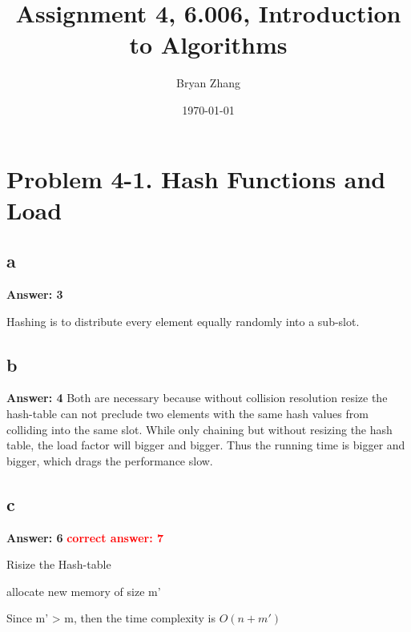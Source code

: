 \documentclass[12pt]{article}%
\newcommand{\runningTime}[1]{$O(#1)$}
\newcommand{\correctAnswer}[1]{\textbf{\textcolor{red}{correct answer: #1  \\}}}
\begin{document}
\title{Assignment 4, 6.006, Introduction to Algorithms}
\author{Bryan Zhang}
\date{\today}
\maketitle



\section{Problem 4-1. Hash Functions and Load}

\subsection{a}
\textbf{Answer: 3} \par
Hashing is to distribute every element equally randomly into a sub-slot.

\subsection{b} 
\textbf{Answer: 4}
Both are necessary because without collision resolution resize the hash-table can not preclude two elements with the same hash values from colliding into the same slot. While only chaining but without resizing the hash table, 	the load factor will bigger and bigger. Thus the running time is bigger and bigger, which drags the performance slow.

\subsection{c}
	\textbf{Answer: 6} \correctAnswer{7}
  \begin{algorithm}
   \caption{Risize the Hash-table}
    \begin{algorithmic}[4-1C]

	        \State allocate new memory of size m' \Comment{\runningTime{1}}
	         \Comment{\runningTime{m'}}
	        \EndFor
	         \Comment{\runningTime{1}}
	        \EndFor  \Comment{\runningTime{n + m}}
	    \EndFunction \Comment{\runningTime{n + m + m'}}

    \end{algorithmic}
   \end{algorithm}
 Since m' > m, then the time complexity is \runningTime{n + m'}
\end{document}
